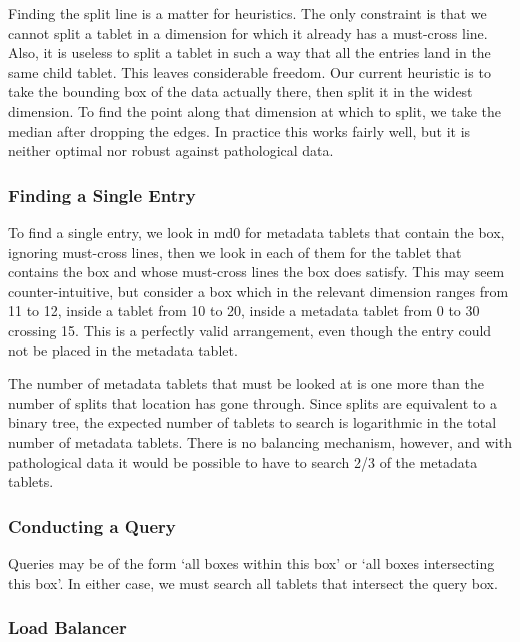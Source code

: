 \documentclass[11pt]{article}
\begin{document}
Finding the split line is a matter for heuristics. The only constraint is that we cannot split a tablet in a dimension for which it already has a must-cross line. Also, it is useless to split a tablet in such a way that all the entries land in the same child tablet. This leaves considerable freedom. Our current heuristic is to take the bounding box of the data actually there, then split it in the widest dimension. To find the point along that dimension at which to split, we take the median after dropping the edges. In practice this works fairly well, but it is neither optimal nor robust against pathological data.

\subsubsection{Finding a Single Entry}

To find a single entry, we look in md0 for metadata tablets that contain the box, ignoring must-cross lines, then we look in each of them for the tablet that contains the box and whose must-cross lines the box does satisfy. This may seem counter-intuitive, but consider a box which in the relevant dimension ranges from 11 to 12, inside a tablet from 10 to 20, inside a metadata tablet from 0 to 30 crossing 15. This is a perfectly valid arrangement, even though the entry could not be placed in the metadata tablet.

The number of metadata tablets that must be looked at is one more than the number of splits that location has gone through. Since splits are equivalent to a binary tree, the expected number of tablets to search is logarithmic in the total number of metadata tablets. There is no balancing mechanism, however, and with pathological data it would be possible to have to search 2/3 of the metadata tablets.

\subsubsection{Conducting a Query}

Queries may be of the form `all boxes within this box' or `all boxes intersecting this box'. In either case, we must search all tablets that intersect the query box. 

\subsubsection{Load Balancer}
\end{document}
